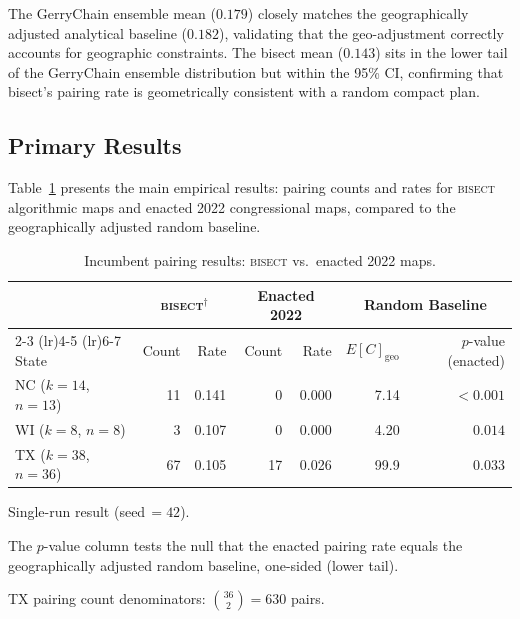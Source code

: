 The GerryChain ensemble mean ($0.179$) closely matches the geographically adjusted
analytical baseline ($0.182$), validating that the geo-adjustment correctly accounts
for geographic constraints.
The bisect mean ($0.143$) sits in the lower tail of the GerryChain ensemble distribution
but within the 95\% CI, confirming that bisect's pairing rate is geometrically
consistent with a random compact plan.

\subsection{Primary Results}

Table~\ref{tab:pairing-results} presents the main empirical results: pairing counts
and rates for \textsc{bisect} algorithmic maps and enacted 2022 congressional maps,
compared to the geographically adjusted random baseline.

\begin{table}[ht]
\centering
\begin{threeparttable}
\caption{Incumbent pairing results: \textsc{bisect} vs.\ enacted 2022 maps.}
\label{tab:pairing-results}
\begin{tabular}{l r r r r r r}
\toprule
 & \multicolumn{2}{c}{\textsc{bisect}$^\dagger$} & \multicolumn{2}{c}{Enacted 2022}
 & \multicolumn{2}{c}{Random Baseline} \\
\cmidrule(lr){2-3} \cmidrule(lr){4-5} \cmidrule(lr){6-7}
State & Count & Rate & Count & Rate & $E[C]_\text{geo}$ & $p$-value (enacted) \\
\midrule
NC ($k=14$, $n=13$) & 11 & 0.141 & 0 & 0.000 & 7.14 & $< 0.001$ \\
WI ($k=8$, $n=8$)   & 3  & 0.107 & 0 & 0.000 & 4.20 & $0.014$ \\
TX ($k=38$, $n=36$) & 67 & 0.105 & 17 & 0.026 & 99.9 & $0.033$ \\
\bottomrule
\end{tabular}
\begin{tablenotes}
\small
\item[$\dagger$] Single-run result (seed\,$=42$).
\item The $p$-value column tests the null that the enacted pairing rate equals the
  geographically adjusted random baseline, one-sided (lower tail).
\item TX pairing count denominators: $\binom{36}{2} = 630$ pairs.
\end{tablenotes}
\end{threeparttable}
\end{table}

